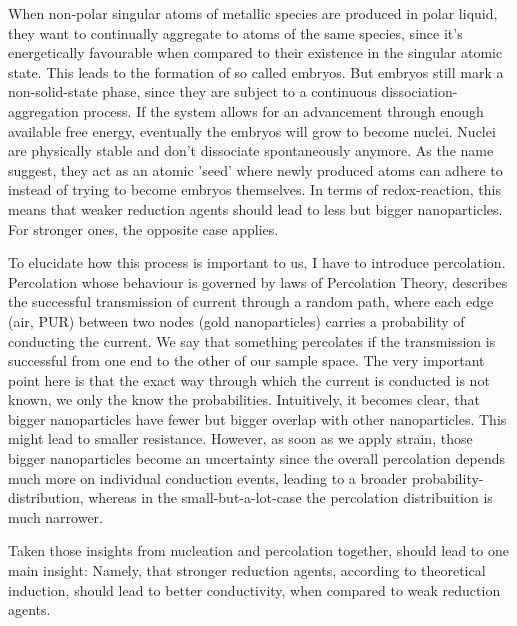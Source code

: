 When non-polar singular atoms of metallic species are produced in polar liquid, they want to continually aggregate to atoms of the same species, since it's energetically favourable when compared to their existence in the singular atomic state. This leads to the formation of so called embryos. \cite{Goia} But embryos still mark a non-solid-state phase, since they are subject to a continuous dissociation-aggregation process. If the system allows for an advancement through enough available free energy, eventually the embryos will grow to become nuclei. Nuclei are physically stable and don't dissociate spontaneously anymore. As the name suggest, they act as an atomic 'seed' where newly produced atoms can adhere to instead of trying to become embryos themselves. In terms of redox-reaction, this means that weaker reduction agents should lead to less but bigger nanoparticles. For stronger ones, the opposite case applies. \cite{LaMer}

To elucidate how this process is important to us, I have to introduce percolation. Percolation whose behaviour is governed by laws of Percolation Theory, describes the successful transmission of current through a random path, where each edge (air, PUR) between two nodes (gold nanoparticles) carries a probability of conducting the current. We say that something percolates if the transmission is successful from one end to the other of our sample space. The very important point here is that the exact way through which the current is conducted is not known, we only the know the probabilities. Intuitively, it becomes clear, that bigger nanoparticles have fewer but bigger overlap with other nanoparticles. This might lead to smaller resistance. However, as soon as we apply strain, those bigger nanoparticles become an uncertainty since the overall percolation depends much more on individual conduction events, leading to a broader probability-distribution, whereas in the small-but-a-lot-case the percolation distribuition is much narrower.   

Taken those insights from nucleation and percolation together, should lead to one main insight: Namely, that stronger reduction agents, according to theoretical induction, should lead to better conductivity, when compared to weak reduction agents.

